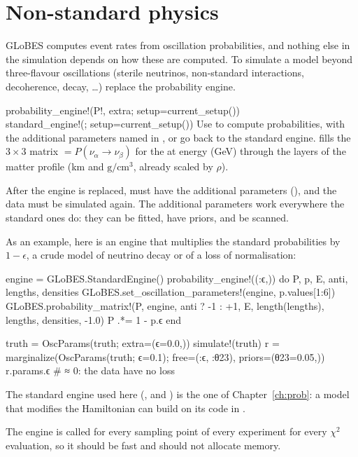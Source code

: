 \chapter{Non-standard physics}\label{ch:nonstandard}

GLoBES computes event rates from oscillation probabilities, and nothing else
in the simulation depends on how these are computed. To simulate a model
beyond three-flavour oscillations (sterile neutrinos, non-standard
interactions, decoherence, decay, \dots) replace the probability engine.

\begin{apifun}{probability\_engine!(P!, extra; setup=current\_setup())\\
standard\_engine!(; setup=current\_setup())}
Use  to compute probabilities, with the additional parameters named
in , or go back to the standard engine.  fills the $3\times3$ matrix
 $=P(\nu_\alpha\to\nu_\beta)$ for the 
 at energy  (GeV) through the layers of the matter
profile (km and $\mathrm{g/cm^3}$, already scaled by $\rho$).
\end{apifun}

\noindent After the engine is replaced,  must have the
additional parameters (), and the data must be
simulated again. The additional parameters work everywhere the standard ones
do: they can be fitted, have priors, and be scanned.

As an example, here is an engine that multiplies the standard probabilities
by $1-\epsilon$, a crude model of neutrino decay or of a loss of
normalisation:
\begin{julia}
engine = GLoBES.StandardEngine()
probability_engine!((:ϵ,)) do P, p, E, anti, lengths, densities
    GLoBES.set_oscillation_parameters!(engine, p.values[1:6])
    GLoBES.probability_matrix!(P, engine, anti ? -1 : +1, E, length(lengths),
                               lengths, densities, -1.0)
    P .*= 1 - p.ϵ
end

truth = OscParams(truth; extra=(ϵ=0.0,))
simulate!(truth)
r = marginalize(OscParams(truth; ϵ=0.1); free=(:ϵ, :θ23), priors=(θ23=0.05,))
r.params.ϵ                     # ≈ 0: the data have no loss
\end{julia}
The standard engine used here (,
 and
) is the one of Chapter~\ref{ch:prob}: a
model that modifies the Hamiltonian can build on its code in
.

\begin{note}
The engine is called for every sampling point of every experiment for every
$\chi^2$ evaluation, so it should be fast and should not allocate memory.
\end{note}
